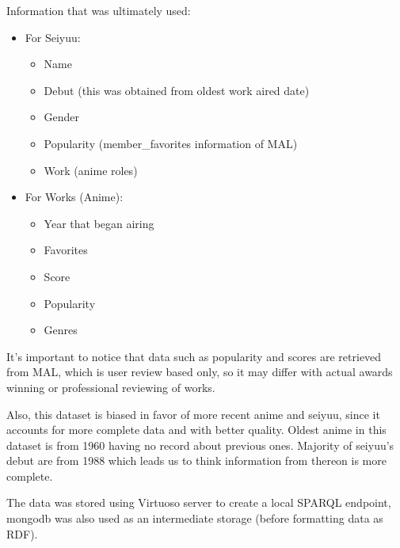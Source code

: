 Information that was ultimately used:
\begin{itemize}
	\item For Seiyuu:
	\begin{itemize}
		\item Name
		\item Debut (this was obtained from oldest work aired date)
		\item Gender
		\item Popularity (member\_favorites information of MAL)
		\item Work (anime roles)
	\end{itemize}
	\item For Works (Anime):
	\begin{itemize}
		\item Year that began airing
		\item Favorites
		\item Score
		\item Popularity
		\item Genres
	\end{itemize}
\end{itemize}

It's important to notice that data such as popularity and scores are retrieved from MAL, which is user review based only, so it may differ with actual awards winning or professional reviewing of works.

Also, this dataset is biased in favor of more recent anime and seiyuu, since it accounts for more complete data and with better quality. Oldest anime in this dataset is from 1960 having no record about previous ones. Majority of seiyuu's debut are from 1988 which leads us to think information from thereon is more complete. 

The data was stored using Virtuoso server to create a local SPARQL endpoint, mongodb was also used as an intermediate storage (before formatting data as RDF).











